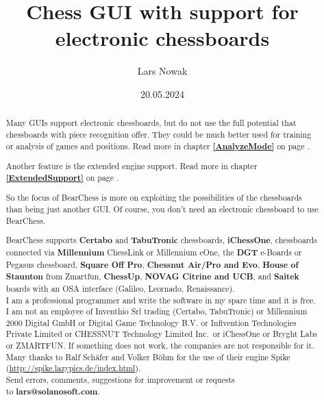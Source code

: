 \documentclass[11pt,a4paper]{article}
\title{Chess GUI with support for electronic chessboards}
\author{Lars Nowak}
\date{20.05.2024}
\begin{document}
	\maketitle
	
	\begin{abstract}
		
		Many GUIs support electronic chessboards, but do not use the full potential that chessboards with piece recognition offer. They could be much better used for training or analysis of games and positions. Read more in chapter \textbf{\ref{AnalyzeMode}  } on page \pageref{AnalyzeMode}.
		
		Another feature is the extended engine support. Read more in chapter \textbf{\ref{ExtendedSupport}  } on page \pageref{ExtendedSupport}.
		
		So the focus of BearChess is more on exploiting the possibilities of the chessboards than being just another GUI. Of course, you don't need an electronic chessboard to use BearChess.
		
		BearChess supports \textbf{Certabo} and \textbf{TabuTronic} chessboards, \textbf{iChessOne}, chessboards connected via \textbf{Millennium} ChessLink or Millennium eOne, the \textbf{DGT} e-Boards or Pegasus chessboard, \textbf{Square Off Pro}, \textbf{Chessnut Air/Pro and Evo},
		\textbf{House of Staunton} from Zmartfun, \textbf{ChessUp}, \textbf{NOVAG Citrine and UCB}, and \textbf{Saitek} boards with an OSA interface (Galileo, Leornado, Renaissance).\\
		
		I am a professional programmer and write the software in my spare time and it is free. I am not an employee of Inventhio Srl trading (Certabo, TabuTronic) or Millennium 2000 Digital GmbH or Digital Game Technology B.V. or Infivention Technologies Private Limited or CHESSNUT Technology Limited Inc.\ or iChessOne or Bryght Labs or ZMARTFUN. If something does not work, the companies are not responsible for it.\\
		
		Many thanks to Ralf Schäfer and Volker Böhm for the use of their engine Spike (\url{http://spike.lazypics.de/index.html}).\\
		
		Send errors, comments, suggestions for improvement or requests\\to \textbf{lars@solanosoft.com}.
		
	\end{abstract}
	
\end{document}

